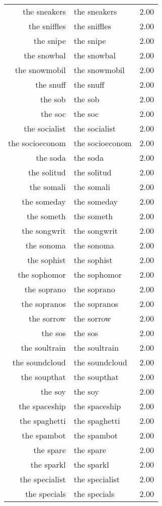 \begin{table}[ht]
\begin{tabular}{rlr}
  the sneakers & the sneakers & 2.00 \\ 
  the sniffles & the sniffles & 2.00 \\ 
  the snipe & the snipe & 2.00 \\ 
  the snowbal & the snowbal & 2.00 \\ 
  the snowmobil & the snowmobil & 2.00 \\ 
  the snuff & the snuff & 2.00 \\ 
  the sob & the sob & 2.00 \\ 
  the soc & the soc & 2.00 \\ 
  the socialist & the socialist & 2.00 \\ 
  the socioeconom & the socioeconom & 2.00 \\ 
  the soda & the soda & 2.00 \\ 
  the solitud & the solitud & 2.00 \\ 
  the somali & the somali & 2.00 \\ 
  the someday & the someday & 2.00 \\ 
  the someth & the someth & 2.00 \\ 
  the songwrit & the songwrit & 2.00 \\ 
  the sonoma & the sonoma & 2.00 \\ 
  the sophist & the sophist & 2.00 \\ 
  the sophomor & the sophomor & 2.00 \\ 
  the soprano & the soprano & 2.00 \\ 
  the sopranos & the sopranos & 2.00 \\ 
  the sorrow & the sorrow & 2.00 \\ 
  the sos & the sos & 2.00 \\ 
  the soultrain & the soultrain & 2.00 \\ 
  the soundcloud & the soundcloud & 2.00 \\ 
  the soupthat & the soupthat & 2.00 \\ 
  the soy & the soy & 2.00 \\ 
  the spaceship & the spaceship & 2.00 \\ 
  the spaghetti & the spaghetti & 2.00 \\ 
  the spambot & the spambot & 2.00 \\ 
  the spare & the spare & 2.00 \\ 
  the sparkl & the sparkl & 2.00 \\ 
  the specialist & the specialist & 2.00 \\ 
  the specials & the specials & 2.00 \\ 

\end{tabular}
\end{table}
